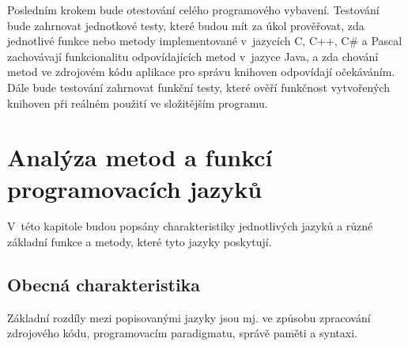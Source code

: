 \documentclass{bakalarka}
\begin{document}
Posledním krokem bude otestování celého programového vybavení. Testování bude zahrnovat jednotkové testy, které budou mít za úkol prověřovat, zda jednotlivé funkce nebo metody implementované v~jazycích C, C++, C\# a Pascal zachovávají funkcionalitu odpovídajících metod v~jazyce Java, a zda chování metod ve zdrojovém kódu aplikace pro správu knihoven odpovídají očekáváním. Dále bude testování zahrnovat funkční testy, které ověří funkčnost vytvořených knihoven při reálném použití ve složitějším programu.

\chapter{Analýza metod a funkcí programovacích jazyků}
V~této kapitole budou popsány charakteristiky jednotlivých jazyků a různé základní funkce a metody, které tyto jazyky poskytují. 

\section{Obecná charakteristika}
Základní rozdíly mezi popisovanými jazyky jsou mj. ve způsobu zpracování zdrojového kódu, programovacím paradigmatu, správě paměti a syntaxi.
\end{document}
